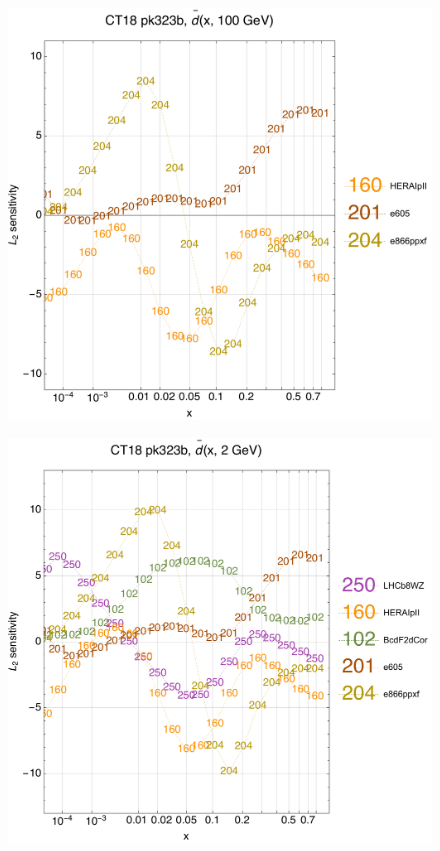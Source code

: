 \documentclass[10pt,aps,prd,floatfix,titlepage]{revtex4}
\begin{document}
\clearpage
\begin{figure}
\includegraphics[width=\textwidth,height=0.44\textheight,keepaspectratio]{1/ifl-2_ct18nn_L2_q100_Sf_1.pdf}
\caption{}
\end{figure}
\begin{figure}
\includegraphics[width=\textwidth,height=0.44\textheight,keepaspectratio]{1/ifl-2_ct18nn_L2_q2_Sf_1.pdf}
\caption{}
\end{figure}
\end{document}
